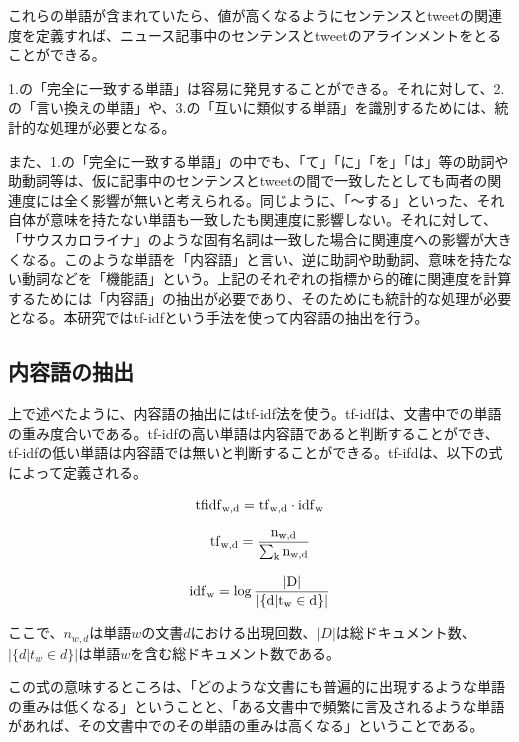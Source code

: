\documentclass[12pt]{jarticle}
\begin{document}
これらの単語が含まれていたら、値が高くなるようにセンテンスとtweetの関連度を定義すれば、ニュース記事中のセンテンスとtweetのアラインメントをとることができる。

1.の「完全に一致する単語」は容易に発見することができる。それに対して、2.の「言い換えの単語」や、3.の「互いに類似する単語」を識別するためには、統計的な処理が必要となる。

また、1.の「完全に一致する単語」の中でも、「て」「に」「を」「は」等の助詞や助動詞等は、仮に記事中のセンテンスとtweetの間で一致したとしても両者の関連度には全く影響が無いと考えられる。同じように、「〜する」といった、それ自体が意味を持たない単語も一致したも関連度に影響しない。それに対して、「サウスカロライナ」のような固有名詞は一致した場合に関連度への影響が大きくなる。このような単語を「内容語」と言い、逆に助詞や助動詞、意味を持たない動詞などを「機能語」という。上記のそれぞれの指標から的確に関連度を計算するためには「内容語」の抽出が必要であり、そのためにも統計的な処理が必要となる。本研究ではtf-idf\cite{tfidf}という手法を使って内容語の抽出を行う。

\subsection{内容語の抽出}
上で述べたように、内容語の抽出にはtf-idf法\cite{tfidf}を使う。tf-idfは、文書中での単語の重み度合いである。tf-idfの高い単語は内容語であると判断することができ、tf-idfの低い単語は内容語では無いと判断することができる。tf-ifdは、以下の式によって定義される。

\begin{equation}
  \rm{tfidf}_{w,d} = \rm{tf}_{w,d} \cdot \rm{idf}_{w}
\end{equation}

\begin{equation}
  \rm{tf}_{w, d} = \frac{n_{w,d}}{\sum_k n_{w,d}}
\end{equation}

\begin{equation}
  \rm{idf}_{w} = \log{\frac{|D|}{|\{d|t_w \in d\}|}}
\end{equation}

ここで、$n_{w,d}$は単語$w$の文書$d$における出現回数、$|D|$は総ドキュメント数、$|\{d|t_w \in d\}|$は単語$w$を含む総ドキュメント数である。

この式の意味するところは、「どのような文書にも普遍的に出現するような単語の重みは低くなる」ということと、「ある文書中で頻繁に言及されるような単語があれば、その文書中でのその単語の重みは高くなる」ということである。
\end{document}
